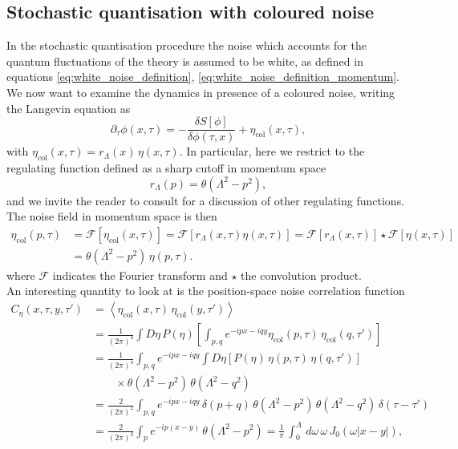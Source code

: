 \subsection{Stochastic quantisation with coloured noise}
\label{sec:coloured_noise}
In the stochastic quantisation procedure the noise which accounts for the quantum fluctuations of the theory is assumed to be white, as defined in equations \eqref{eq:white_noise_definition}, \eqref{eq:white_noise_definition_momentum}. 
We now want to examine the dynamics in presence of a coloured noise, writing the Langevin equation as
\begin{equation*}
    \partial_\tau \phi(x, \tau) = - \frac{\delta S[\phi]}{\delta \phi (\tau, x)} + \eta_\text{col}(x, \tau),
    \label{eq:Langevin_scalar_regularised}
\end{equation*}
with $\eta_\text{col}(x,\tau) = r_\Lambda(x) \, \eta(x,\tau)$. In particular, here we restrict to the regulating function defined as a sharp cutoff in momentum space
\begin{equation}
    r_\Lambda(p) = \theta(\Lambda^2 - p^2),
    \label{eq:regulator}
\end{equation}
and we invite the reader to consult \cite{Pawlowski2017CoolingNoise} for a discussion of other regulating functions. \\
The noise field in momentum space is then
\begin{equation*}
    \begin{aligned}
        \eta_\text{col}(p, \tau) &= \mathcal{F}[\eta_\text{col}(x,\tau)] = \mathcal{F}[r_\Lambda(x,\tau) \eta(x,\tau)] = \mathcal{F}[r_\Lambda(x,\tau)] \star \mathcal{F}[\eta(x,\tau)] \\
        &= \theta(\Lambda^2 - p^2)  \, \eta(p, \tau).
    \end{aligned}
\end{equation*}
where $\mathcal{F}$ indicates the Fourier transform and $\star$ the convolution product. \\
An interesting quantity to look at is the position-space noise correlation function
\begin{equation}
    \begin{aligned}
        C_{\eta}(x,\tau,y,\tau') &= \left\langle\eta_\text{col}(x,\tau) \, \eta_\text{col}(y,\tau')\right\rangle \\
        &= \frac{1}{(2\pi)^{4}} \int D\eta \, P(\eta) \left[\int_{p,q} e^{-ipx-iqy }\eta_\text{col}(p,\tau) \, \eta_\text{col}(q,\tau')\right] \\
        &= \frac{1}{(2\pi)^{4}} \int_{p,q} e^{-ipx-iqy } \int D\eta \left[ P(\eta) \, \eta(p,\tau) \, \eta(q,\tau') \right] \\
        &\qquad\times \theta(\Lambda^2 - p^2) \, \theta(\Lambda^2 - q^2)  \\
        &= \frac{2}{(2\pi)^{2}} \int_{p,q} e^{-ipx-iqy} \, \delta(p+q) \, \theta(\Lambda^2 - p^2) \, \theta(\Lambda^2 - q^2) \, \delta(\tau - \tau') \\
        &= \frac{2}{(2\pi)^{2}} \int_{p} e^{-ip(x-y)} \, \theta(\Lambda^2 - p^2) = \frac{1}{\pi} \, \int_0^\Lambda \, d\omega \, \omega \, J_0(\omega |x-y|),
    \end{aligned}
    \label{eq:coloured_noise_correlation}
\end{equation}
